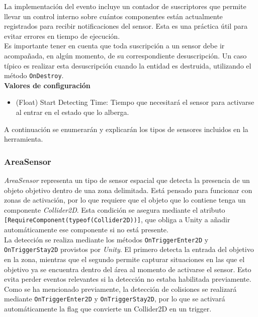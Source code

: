 La implementación del evento incluye un contador de suscriptores que permite llevar un control interno sobre cuántos componentes están actualmente registrados para recibir notificaciones del sensor. Esta es una práctica útil para evitar errores en tiempo de ejecución.\\

Es importante tener en cuenta que toda suscripción a un sensor debe ir acompañada, en algún momento, de su correspondiente desuscripción. Un caso típico es realizar esta desuscripción cuando la entidad es destruida, utilizando el método \texttt{OnDestroy}.\\

\textbf{Valores de configuración}
\begin{itemize}
	\item (Float) Start Detecting Time: Tiempo que necesitará el sensor para activarse al entrar en el estado que lo alberga.
\end{itemize}


A continuación se enumerarán y explicarán los tipos de sensores incluidos en la herramienta.\\
\subsubsection{AreaSensor}

\textit{AreaSensor} representa un tipo de sensor espacial que detecta la presencia de un objeto objetivo dentro de una zona delimitada. Está pensado para funcionar con zonas de activación, por lo que requiere que el objeto que lo contiene tenga un componente \textit{Collider2D}. Esta condición se asegura mediante el atributo \texttt{[RequireComponent(typeof(Collider2D))]}, que obliga a Unity a añadir automáticamente ese componente si no está presente.\\

La detección se realiza mediante los métodos \texttt{OnTriggerEnter2D} y \texttt{OnTriggerStay2D} provistos por \textit{Unity}. El primero detecta la entrada del objetivo en la zona, mientras que el segundo permite capturar situaciones en las que el objetivo ya se encuentra dentro del área al momento de activarse el sensor. Esto evita perder eventos relevantes si la detección no estaba habilitada previamente.\\

Como se ha mencionado previamente, la detección de colisiones se realizará mediante \texttt{OnTriggerEnter2D} y \texttt{OnTriggerStay2D}, por lo que se activará automáticamente la flag que convierte un Collider2D en un trigger.\\

